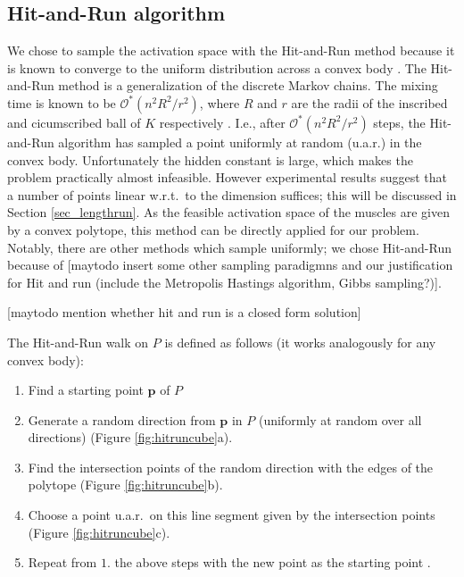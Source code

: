 \subsection{Hit-and-Run algorithm}
We chose to sample the activation space with the Hit-and-Run method because it is known to converge to the uniform distribution across a convex body \cite{smith1984efficient}. The Hit-and-Run method is a generalization of the discrete Markov chains. The mixing time is known to be $\mathcal{O}^*(n^2R^2/r^2)$, where $R$ and $r$ are the radii of the inscribed and cicumscribed ball of $K$ respectively \cite{Dyer, Lovasz}. I.e., after $\mathcal{O}^*(n^2R^2/r^2)$ steps, the Hit-and-Run algorithm has sampled a point uniformly at random (u.a.r.) in the convex body. Unfortunately the hidden constant is large, which makes the problem practically almost infeasible. However experimental results suggest that a number of points linear w.r.t.\ to the dimension suffices; this will be discussed in Section \ref{sec_lengthrun}.
As the feasible activation space of the muscles are given by a convex polytope, this method can be directly applied for our problem. Notably, there are other methods which sample uniformly; we chose Hit-and-Run because of [maytodo insert some other sampling paradigmns and our justification for Hit and run (include the Metropolis Hastings algorithm, Gibbs sampling?)].

[maytodo mention whether hit and run is a closed form solution]

The Hit-and-Run walk on $P$ is defined as follows (it works analogously for any convex body):
\begin{enumerate}
\item Find a starting point $\textbf{p}$ of $P$ %
\item Generate a random direction from $\textbf{p}$ in $P$ (uniformly at random over all directions) (Figure \ref{fig:hitruncube}a).
\item Find the intersection points of the random direction with the edges of the polytope (Figure \ref{fig:hitruncube}b).
\item Choose a point u.a.r.\ on this line segment given by the intersection points (Figure \ref{fig:hitruncube}c). 
\item Repeat from $1.$ the above steps with the new point as the starting point .
\end{enumerate}


